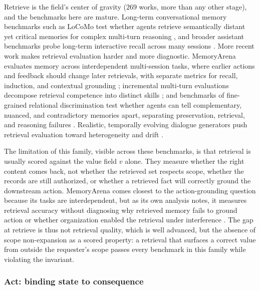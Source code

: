 Retrieve is the field's center of gravity ($269$ works, more than any other stage), and the benchmarks here are mature. Long-term conversational memory benchmarks such as LoCoMo test whether agents retrieve semantically distant yet critical memories for complex multi-turn reasoning \citep{maharana2024evaluatinglongtermconversationalmemory}, and broader assistant benchmarks probe long-term interactive recall across many sessions \citep{wu2025longmemevalbenchmarkingchatassistants}. More recent work makes retrieval evaluation harder and more diagnostic. MemoryArena evaluates memory across interdependent multi-session tasks, where earlier actions and feedback should change later retrievals, with separate metrics for recall, induction, and contextual grounding \citep{he2026memoryarena}; incremental multi-turn evaluations decompose retrieval competence into distinct skills \citep{hu2026evaluatingmemoryllmagents}; and benchmarks of fine-grained relational discrimination test whether agents can tell complementary, nuanced, and contradictory memories apart, separating preservation, retrieval, and reasoning failures \citep{wang2026subtlememory}. Realistic, temporally evolving dialogue generators push retrieval evaluation toward heterogeneity and drift \citep{zhang2026rhelm}.

The limitation of this family, visible across these benchmarks, is that retrieval is usually scored against the value field $v$ alone. They measure whether the right content comes back, not whether the retrieved set respects scope, whether the records are still authorized, or whether a retrieved fact will correctly ground the downstream action. MemoryArena comes closest to the action-grounding question because its tasks are interdependent, but as its own analysis notes, it measures retrieval accuracy without diagnosing why retrieved memory fails to ground action or whether organization enabled the retrieval under interference \citep{he2026memoryarena}. The gap at retrieve is thus not retrieval quality, which is well advanced, but the absence of scope non-expansion as a scored property: a retrieval that surfaces a correct value from outside the requester's scope passes every benchmark in this family while violating the invariant.

\subsubsection{Act: binding state to consequence}

